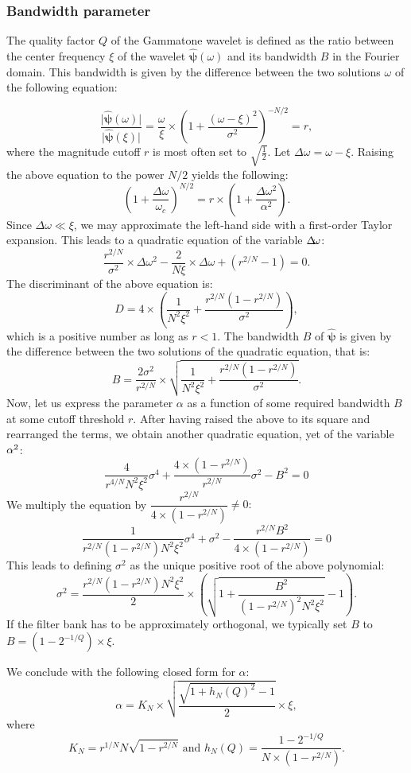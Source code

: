 \documentclass[smallextended]{svjour3}
\begin{document}
\subsubsection*{Bandwidth parameter}

The quality factor $Q$ of the Gammatone wavelet is defined as the
ratio between the center frequency $\xi$ of the wavelet $\boldsymbol{\hat{\psi}}(\omega)$
and its bandwidth $B$ in the Fourier domain. This bandwidth is given
by the difference between the two solutions $\omega$ of the following
equation:

\[
\dfrac{\vert\boldsymbol{\hat{\psi}}(\omega)\vert}{\vert\boldsymbol{\hat{\psi}}(\xi)\vert}=\dfrac{\omega}{\xi}\times\left(1+\dfrac{\left(\omega-\xi\right)^{2}}{\sigma^{2}}\right)^{-N/2}=r,
\]
where the magnitude cutoff $r$ is most
often set to $\sqrt{\frac{1}{2}}$. Let $\Delta\omega=\omega-\xi$.
Raising the above equation to the power $N/2$ yields the following:
\[
\left(1+\dfrac{\Delta\omega}{\omega_{c}}\right)^{N/2}=r\times\left(1+\frac{\Delta\omega^{2}}{\alpha^{2}}\right).
\]
Since $\Delta\omega\ll\xi$, we may approximate the left-hand side
with a first-order Taylor expansion. This leads to a quadratic equation
of the variable $\Delta\negmedspace\omega$:
\[
\dfrac{r^{2/N}}{\sigma^{2}}\times\Delta\omega^{2}-\dfrac{2}{N\xi}\times\Delta\omega+\left(r^{2/N}-1\right)=0.
\]
The discriminant of the above equation is:
\[
D=4\times\left(\dfrac{1}{N^{2}\xi^{2}}+\dfrac{r^{2/N}\left(1-r^{2/N}\right)}{\sigma^{2}}\right),
\]
which is a positive number as long as $r<1$. The bandwidth $B$ of
$\boldsymbol{\hat{\psi}}$ is given by the difference between the
two solutions of the quadratic equation, that is:
\[
B=\dfrac{2\sigma^{2}}{r^{2/N}}\times\sqrt{\dfrac{1}{N^{2}\xi^{2}}+\dfrac{r^{2/N}\left(1-r^{2/N}\right)}{\sigma^{2}}}.
\]
Now, let us express the parameter $\alpha$ as a function of some
required bandwidth $B$ at some cutoff threshold $r$. After having
raised the above to its square and rearranged the terms, we obtain
another quadratic equation, yet of the variable $\mbox{\ensuremath{\alpha}}^{2}$:
\[
\dfrac{4}{r^{4/N}N^{2}\xi^{2}}\sigma^{4}+\dfrac{4\times\left(1-r^{2/N}\right)}{r^{2/N}}\sigma^{2}-B^{2}=0
\]
We multiply the equation by $\dfrac{r^{2/N}}{4\times\left(1-r^{2/N}\right)}\neq0:$
\[
\dfrac{1}{r^{2/N}\left(1-r^{2/N}\right)N^{2}\xi^{2}}\sigma^{4}+\sigma^{2}-\dfrac{r^{2/N}B^{2}}{4\times\left(1-r^{2/N}\right)}=0
\]
This leads to defining $\sigma^{2}$ as the unique positive root of
the above polynomial:
\[
\sigma^{2}=\dfrac{r^{2/N}\left(1-r^{2/N}\right)N^{2}\xi^{2}}{2}\times\left(\sqrt{1+\dfrac{B^{2}}{\left(1-r^{2/N}\right)^{2}N^{2}\xi^{2}}}-1\right).
\]
If the filter bank has to be approximately orthogonal, we typically
set $B$ to $B=\left(1-2^{-1/Q}\right)\times\xi$.

We conclude with the following closed form for $\alpha$:
\[
\alpha=K_{N}\times\sqrt{\dfrac{\sqrt{1+h_{N}\left(Q\right)^{2}}-1}{2}}\times\xi,
\]
where 
\[
K_{N}=r^{1/N}N\sqrt{1-r^{2/N}}\mbox{ and }h_{N}\left(Q\right)=\dfrac{1-2^{-1/Q}}{N\times\left(1-r^{2/N}\right)}.
\]





\end{document}
